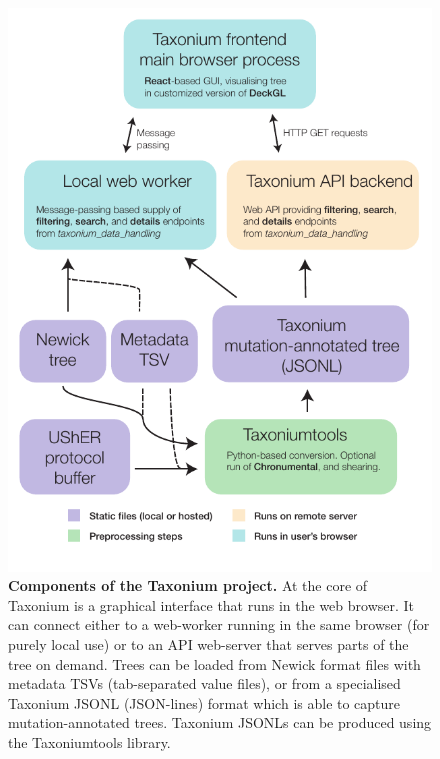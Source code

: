 \documentclass[twocolumn]{bioRxiv}
\providecommand{\DIFadd}[1]{{\protect\color{teal}#1}}
\providecommand{\DIFaddFL}[1]{\DIFadd{#1}}
\providecommand{\DIFaddbeginFL}{}
\providecommand{\DIFaddendFL}{}
\begin{document}
\begin{figure}

\begin{center}
\includegraphics[width=\linewidth]{Figures/TaxoniumFlowChart.pdf}
\end{center}
\caption{\textbf{Components of the Taxonium project.} At the core of Taxonium is a graphical interface that runs in the web browser. It can connect either to a web-worker running in the same browser (for purely local use) or to an API web-server that serves parts of the tree on demand. Trees can be loaded from Newick format files with metadata TSVs \DIFaddbeginFL \DIFaddFL{(tab-separated value files)}\DIFaddendFL , or from a specialised Taxonium JSONL \DIFaddbeginFL \DIFaddFL{(JSON-lines) }\DIFaddendFL format which is able to capture mutation-annotated trees. Taxonium JSONLs can be produced using the Taxoniumtools library.}
\label{fig:flowchart}
\end{figure}
\end{document}
